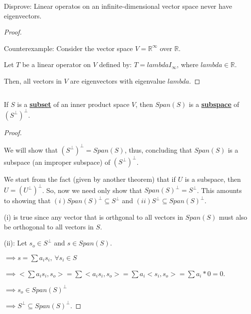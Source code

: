 \documentclass{article}
\newenvironment{customthm}[1]
  {\renewcommand\theinnercustomthm{#1}\innercustomthm}
  {\endinnercustomthm}
\begin{document}
\begin{customthm}{4}[2023.S(1.A.iv)]
  $ $

  Disprove: Linear operatos on an infinite-dimensional vector space never have eigenvectors. 

\end{customthm}

\begin{proof}
  $ $

  Counterexample: Consider the vector space $V = \mathbb{R}^\infty$ over $\mathbb{R}$.

  Let $T$ be a linear operator on $V$ defined by: $T = lambdaI_\infty$, where $lambda \in \mathbb{R}$.

  Then, all vectors in $V$ are eigenvectors with eigenvalue $lambda$.

  
\end{proof}
\newpage

\begin{customthm}{5}[2023.S(1.A.v)]
  $ $

  If $S$ is a \textbf{\underline{subset}} of an inner product space $V$, then $Span(S)$ is a \textbf{\underline{subspace}} of $(S^\perp)^\perp$.

\end{customthm}

\begin{proof}
  $ $

  We will show that $(S^\perp)^\perp = Span(S)$,  thus, concluding that $Span(S)$ is a subspace (an improper subspace) of $(S^\perp)^\perp$.
  \newline
  
  We start from the fact (given by another theorem) that if $U$ is a subspace, then $U = (U^\perp)^\perp$. So, now we need only show that $Span(S)^\perp = S^\perp$. This amounts to showing that $(i) Span(S)^\perp \subseteq S^\perp$ and $(ii) S^\perp \subseteq Span(S)^\perp$.
  \newline

  (i) is true since any vector that is orthgonal to all vectors in $Span(S)$ must also be orthogonal to all vectors in $S$.
  \newline

  (ii): Let $s_o \in S^\perp$ and $s \in Span(S)$.

  \noindent
  $\implies s = \sum a_i s_i, \ \forall s_i \in S$

  \noindent
  $\implies <\sum a_i s_i, s_o> = \sum <a_i s_i, s_o> = \sum a_i <s_i, s_o> = \sum a_i * 0 = 0$.

  \noindent
  $\implies s_o \in Span(S)^\perp$

  \noindent
  $\implies S^\perp \subseteq Span(S)^\perp$.

\end{proof}
\newpage
\end{document}
